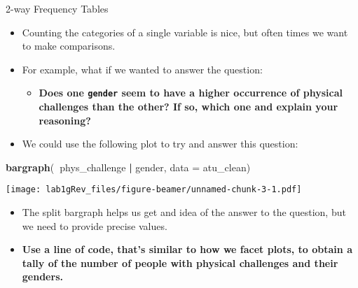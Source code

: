 \documentclass[
  ignorenonframetext,
]{beamer}
\newenvironment{Shaded}{\begin{snugshade}}{\end{snugshade}}
\newcommand{\DataTypeTok}[1]{\textcolor[rgb]{0.13,0.29,0.53}{#1}}
\newcommand{\KeywordTok}[1]{\textcolor[rgb]{0.13,0.29,0.53}{\textbf{#1}}}
\newcommand{\NormalTok}[1]{#1}
\newcommand{\OperatorTok}[1]{\textcolor[rgb]{0.81,0.36,0.00}{\textbf{#1}}}
\newcommand{\StringTok}[1]{\textcolor[rgb]{0.31,0.60,0.02}{#1}}
\providecommand{\tightlist}{%
  \setlength{\itemsep}{0pt}\setlength{\parskip}{0pt}}
\begin{document}
\begin{frame}[fragile]{2-way Frequency Tables}
\protect\hypertarget{way-frequency-tables}{}

\begin{itemize}
\tightlist
\item
  Counting the categories of a single variable is nice, but often times
  we want to make comparisons.
\item
  For example, what if we wanted to answer the question:

  \begin{itemize}
  \tightlist
  \item
    \textbf{Does one \texttt{gender} seem to have a higher occurrence of
    physical challenges than the other? If so, which one and explain
    your reasoning?}
  \end{itemize}
\item
  We could use the following plot to try and answer this question:
\end{itemize}

\begin{Shaded}
\begin{Highlighting}[]
\KeywordTok{bargraph}\NormalTok{(}\OperatorTok{~}\NormalTok{phys_challenge }\OperatorTok{|}\StringTok{ }\NormalTok{gender, }\DataTypeTok{data =}\NormalTok{ atu_clean)}
\end{Highlighting}
\end{Shaded}

\texttt{[image: lab1gRev\_files/figure-beamer/unnamed-chunk-3-1.pdf]}

\begin{itemize}
\tightlist
\item
  The split bargraph helps us get and idea of the answer to the
  question, but we need to provide precise values.
\item
  \textbf{Use a line of code, that's similar to how we facet plots, to
  obtain a tally of the number of people with physical challenges and
  their genders.}
\end{itemize}

\end{frame}
\end{document}
